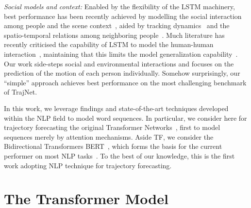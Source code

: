 \documentclass[a4paper,conference]{IEEEtran}
\begin{document}
\noindent\textit{Social models and context:}
Enabled by the flexibility of the LSTM machinery, best performance has been recently achieved by modelling the social interaction~\cite{alahi2016cvpr,gupta2018social,vemula2018social} among people and the scene context~\cite{sadeghian2019sophie,salzmann2020trajectron++,kosaraju2019social}, aided by tracking dynamics~\cite{sadeghian2017tracking} and the spatio-temporal relations among neighboring people~\cite{ijcai2017-386,su2016crowd}.
Much literature has recently criticised the capability of LSTM to model the human-human interaction~\cite{scholler2020constant,becker2018red,becker2018evaluation}, maintaining that this limits the model generalization capability~\cite{scholler2020constant}. Our work side-steps social and environmental interactions and focuses on the prediction of the motion of each person individually. Somehow surprisingly, our ``simple'' approach achieves best performance on the most challenging benchmark of TrajNet.

In this work, we leverage findings and state-of-the-art techniques developed within the NLP field to model word sequences. In particular, we consider here for trajectory forecasting the original Transformer Networks~\cite{TransformersNIPS17}, first to model sequences merely by attention mechanisms. Aside TF, we consider the Bidirectional Transformers BERT~\cite{BERT19}, which forms the basis for the current performer on most NLP tasks~\cite{RoBERTa19}. To the best of our knowledge, this is the first work adopting NLP technique for trajectory forecasting.




























 


\section{The Transformer Model}\label{sec:method}
\end{document}
